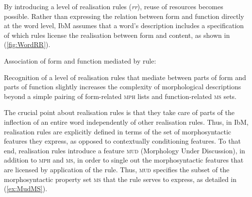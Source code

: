 \documentclass[output=paper
 	        ,biblatex
                ,babelshorthands
                ,newtxmath
                ,draftmode
                ,colorlinks, citecolor=brown
]{langscibook}
\begin{document}
\begin{exe}
\begin{xlist}
By  introducing a level of realisation rules (\textit{rr}), reuse
of resources becomes possible. Rather than expressing the relation
between form and function directly at the word level, IbM assumes that
a word's description includes a specification of which rules license
the realisation between form and content, as shown in 
(\ref{fig:WordRR}).


\eas
\label{fig:WordRR}
Association of form and function mediated by rule:\\
%
%
%
\zs

Recognition of a level of realisation rules that mediate between parts
of form and parts of function slightly increases the complexity of
morphological descriptions beyond a simple pairing of form-related
\textsc{mph} lists and function-related \textsc{ms} sets. 

The crucial point about realisation rules is that they take care of
parts of the inflection of an entire word independently of other
realisation rules. Thus, in IbM, realisation rules are explicitly
defined in terms of the set of morphosyntactic features they express,
as opposed to contextually conditioning features. To that end, realisation
rules introduce a feature \textsc{mud} (Morphology Under Discussion),
in addition to \textsc{mph} and \textsc{ms}, in order to single out
the morphosyntactic features that are licensed by application of the
rule. Thus, \textsc{mud} specifies the subset of the morphosyntactic
property set \textsc{ms} that the rule serves to express, as detailed
in (\ref{ex:MudMS}). 


\end{xlist}
\end{exe}
\end{document}
